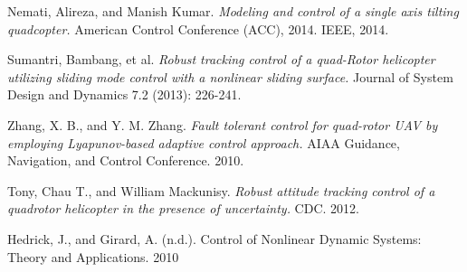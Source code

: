 \documentclass[conference]{IEEEtran}
\begin{document}


%
%
%
\begin{thebibliography}{1}

Nemati, Alireza, and Manish Kumar. \emph{Modeling and control of a single axis tilting quadcopter.} American Control Conference (ACC), 2014. IEEE, 2014.

Sumantri, Bambang, et al. \emph{Robust tracking control of a quad-Rotor helicopter utilizing sliding mode control with a nonlinear sliding surface.} Journal of System Design and Dynamics 7.2 (2013): 226-241.

Zhang, X. B., and Y. M. Zhang. \emph{Fault tolerant control for quad-rotor UAV by employing Lyapunov-based adaptive control approach.} AIAA Guidance, Navigation, and Control Conference. 2010.

Tony, Chau T., and William Mackunisy. \emph{Robust attitude tracking control of a quadrotor helicopter in the presence of uncertainty.} CDC. 2012.

Hedrick, J., and Girard, A. (n.d.). Control of Nonlinear Dynamic Systems: Theory and Applications. 2010


\end{thebibliography}



\end{document}

